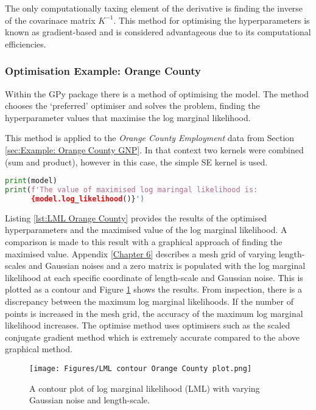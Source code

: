 \documentclass[12pt,a4paper]{article}
\begin{document}
The only computationally taxing element of the derivative is finding the inverse of the covarinace matrix \(K^{-1}\). This method for optimising the hyperparameters is known as gradient-based and is considered advantageous due to its computational efficiencies.

\subsubsection{Optimisation Example: Orange County}

Within the GPy package there is a method of optimising the model. The method chooses the `preferred' optimiser and solves the problem, finding the hyperparameter values that maximise the log marginal likelihood.

This method is applied to the \textit{Orange County Employment} data from Section \ref{sec:Example: Orange County GNP}. In that context two kernels were combined (sum and product), however in this case, the simple SE kernel is used.

\vspace{10pt}
\begin{lstlisting}[language=python, caption={Code provding the results.}, label={lst:LML Orange County}]
print(model)
print(f'The value of maximised log maringal likelihood is:
      {model.log_likelihood()}')
\end{lstlisting}

Listing \ref{lst:LML Orange County} provides the results of the optimised hyperparameters and the maximised value of the log marginal likelihood. A comparison is made to this result with a graphical approach of finding the maximised value. Appendix \ref{Chapter 6} describes a mesh grid of varying length-scales and Gaussian noises and a zero matrix is populated with the log marginal likelihood at each specific coordinate of length-scale and Gaussian noise. This is plotted as a contour and Figure \ref{fig:LML contour Orange County plot} shows the results. From inspection, there is a discrepancy between the maximum log marginal likelihoods. If the number of points is increased in the mesh grid, the accuracy of the maximum log marginal likelihood increases. The optimise method uses optimisers such as the scaled conjugate gradient method which is extremely accurate compared to the above graphical method. 

\begin{figure}[h]
\centering
\texttt{[image: Figures/LML contour Orange County plot.png]} 
\caption{A contour plot of log marginal likelihood (LML) with varying Gaussian noise and length-scale.} \label{fig:LML contour Orange County plot}
\end{figure}
\end{document}
